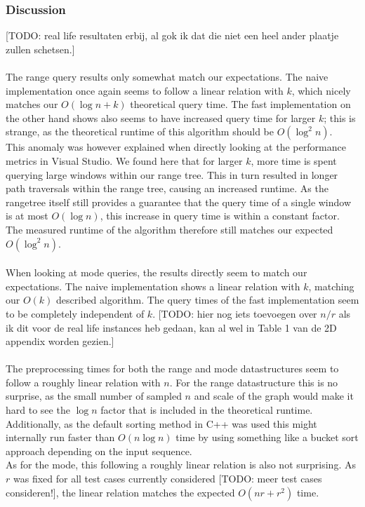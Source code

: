 \documentclass{article}
\newcommand{\todo}[1]{{\color{red}[#1]}}
\begin{document}
\subsubsection*{Discussion}
\todo{TODO: real life resultaten erbij, al gok ik dat die niet een heel ander plaatje zullen schetsen.}\\\\
The range query results only somewhat match our expectations. The naive implementation once again seems to follow a linear relation with $k$, which nicely matches our $O(\log n + k)$ theoretical query time. The fast implementation on the other hand shows also seems to have increased query time for larger $k$; this is strange, as the theoretical runtime of this algorithm should be $O(\log^2 n)$. \\
This anomaly was however explained when directly looking at the performance metrics in Visual Studio. We found here that for larger $k$, more time is spent querying large windows within our range tree. This in turn resulted in longer path traversals within the range tree, causing an increased runtime. As the rangetree itself still provides a guarantee that the query time of a single window is at most $O(\log n)$, this increase in query time is within a constant factor. The measured runtime of the algorithm therefore still matches our expected $O(\log^2 n)$. \\\\
When looking at mode queries, the results directly seem to match our expectations. The naive implementation shows a linear relation with $k$, matching our $O(k)$ described algorithm. The query times of the fast implementation seem to be completely independent of $k$. \todo{TODO: hier nog iets toevoegen over $n/r$ als ik dit voor de real life instances heb gedaan, kan al wel in Table 1 van de 2D appendix worden gezien.} \\\\
The preprocessing times for both the range and mode datastructures seem to follow a roughly linear relation with $n$. For the range datastructure this is no surprise, as the small number of sampled $n$ and scale of the graph would make it hard to see the $\log n$ factor that is included in the theoretical runtime. Additionally, as the default sorting method in C++ was used this might internally run faster than $O(n \log n)$ time by using something like a bucket sort approach depending on the input sequence. \\
As for the mode, this following a roughly linear relation is also not surprising. As $r$ was fixed for all test cases currently considered \todo{TODO: meer test cases consideren!}, the linear relation matches the expected $O(nr + r^2)$ time.
\end{document}
